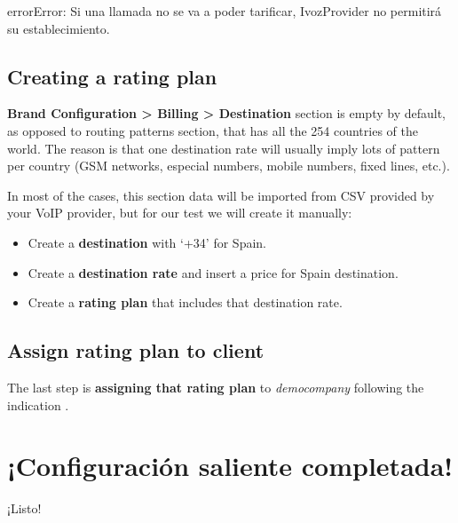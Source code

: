 \documentclass[letterpaper,10pt,spanish]{sphinxmanual}
\begin{document}
\begin{notice}{error}{Error:}
Si una llamada no se va a poder tarificar, IvozProvider no permitirá su establecimiento.
\end{notice}


\subsection{Creating a rating plan}
\label{getting_started/external_outgoing_calls/noplan_nocall:creating-a-rating-plan}
\textbf{Brand Configuration \textgreater{} Billing \textgreater{} Destination} section is empty by default, as opposed to routing patterns section,
that has all the 254 countries of the world. The reason is that one destination rate
will usually imply lots of pattern per country (GSM networks, especial numbers,
mobile numbers, fixed lines, etc.).

In most of the cases, this section data will be imported from CSV provided by your
VoIP provider, but for our test we will create it manually:
\begin{itemize}
\item {} 
Create a \textbf{destination} with `+34' for Spain.

\item {} 
Create a \textbf{destination rate} and insert a price for Spain destination.

\item {} 
Create a \textbf{rating plan} that includes that destination rate.

\end{itemize}


\subsection{Assign rating plan to client}
\label{getting_started/external_outgoing_calls/noplan_nocall:assign-rating-plan-to-client}
The last step is \textbf{assigning that rating plan} to \emph{democompany} following the indication
{\hyperref[administration_portal/brand/billing/rating_plans:assigning\string-rating\string-plans\string-to\string-clients]{}}.


\section{¡Configuración saliente completada!}
\label{getting_started/external_outgoing_calls/finish:outgoing-configuration-complete}\label{getting_started/external_outgoing_calls/finish::doc}
¡Listo!
\end{document}
